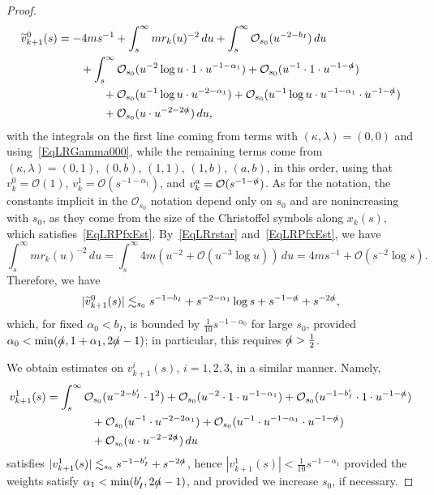 \documentclass[reqno,11pt,letterpaper]{amsart}
\numberwithin{equation}{section}
\numberwithin{figure}{section}
\theoremstyle{definition}
\theoremstyle{remark}
\newcommand{\mc}{\mathcal}
\newcommand{\cO}{\mc O}
\newcommand{\slalpha}{\slashed{\alpha}{}}
\newcommand{\wt}{\widetilde}
\newcommand{\half}{\tfrac{1}{2}}
\begin{document}
\begin{proof}
\begin{equation}
  \label{EqLRPfV0}
  \begin{split}
    \wt v_{k+1}^0(s) &= -4 m s^{-1} + \int_s^\infty m r_k(u)^{-2}\,d u + \int_s^\infty \cO_{s_0}(u^{-2-b_I})\,d u \\
      &\qquad + \int_s^\infty \cO_{s_0}(u^{-2}\log u\cdot 1\cdot u^{-1-\alpha_1}) + \cO_{s_0}(u^{-1}\cdot 1\cdot u^{-1-\slalpha}) \\
      &\qquad\qquad + \cO_{s_0}(u^{-1}\log u\cdot u^{-2-\alpha_1}) + \cO_{s_0}(u^{-1}\log u\cdot u^{-1-\alpha_1}\cdot u^{-1-\slalpha}) \\
      &\qquad\qquad + \cO_{s_0}(u\cdot u^{-2-2\slalpha})\,d u,
  \end{split}
  \end{equation}
  with the integrals on the first line coming from terms with $(\kappa,\lambda)=(0,0)$ and using~\eqref{EqLRGamma000}, while the remaining terms come from $(\kappa,\lambda)=(0,1)$, $(0,b)$, $(1,1)$, $(1,b)$, $(a,b)$, in this order, using that $v_k^0=\cO(1)$, $v_k^1=\cO(s^{-1-\alpha_1})$, and $v_k^a=\cO(s^{-1-\slalpha})$. As for the notation, the constants implicit in the $\cO_{s_0}$ notation depend only on $s_0$ and are nonincreasing with $s_0$, as they come from the size of the Christoffel symbols along $x_k(s)$, which satisfies~\eqref{EqLRPfxEst}. By~\eqref{EqLRrstar} and~\eqref{EqLRPfxEst}, we have
  \[
    \int_s^\infty m r_k(u)^{-2}\,d u=\int_s^\infty 4 m(u^{-2}+\cO(u^{-3}\log u))\,d u = 4 m s^{-1} + \cO(s^{-2}\log s).
  \]
  Therefore, we have
  \[
    |\wt v^0_{k+1}(s)| \lesssim_{s_0} s^{-1-b_I} + s^{-2-\alpha_1}\log s + s^{-1-\slalpha} + s^{-2\slalpha},
  \]
  which, for fixed $\alpha_0<b_I$, is bounded by $\frac{1}{10}s^{-1-\alpha_0}$ for large $s_0$, provided $\alpha_0<\min(\slalpha,1+\alpha_1,2\slalpha-1)$; in particular, this requires $\slalpha>\half$.
  
  We obtain estimates on $v_{k+1}^i(s)$, $i=1,2,3$, in a similar manner. Namely,
  \begin{equation}
  \label{EqLRPfV1}
  \begin{split}
    v_{k+1}^1(s) &= \int_s^\infty \cO_{s_0}(u^{-2-b'_I}\cdot 1^2) + \cO_{s_0}(u^{-2}\cdot 1\cdot u^{-1-\alpha_1}) + \cO_{s_0}(u^{-1-b'_I}\cdot 1\cdot u^{-1-\slalpha}) \\
      &\qquad\qquad + \cO_{s_0}(u^{-1}\cdot u^{-2-2\alpha_1}) + \cO_{s_0}(u^{-1}\cdot u^{-1-\alpha_1}\cdot u^{-1-\slalpha}) \\
      &\qquad\qquad + \cO_{s_0}(u\cdot u^{-2-2\slalpha})\,d u
  \end{split}
  \end{equation}
  satisfies $|v_{k+1}^1(s)|\lesssim_{s_0}s^{-1-b'_I}+s^{-2\slalpha}$, hence $|v_{k+1}^1(s)|<\frac{1}{10}s^{-1-\alpha_1}$ provided the weights satisfy $\alpha_1<\min(b'_I,2\slalpha-1)$, and provided we increase $s_0$, if necessary.
  

\end{proof}
\end{document}
